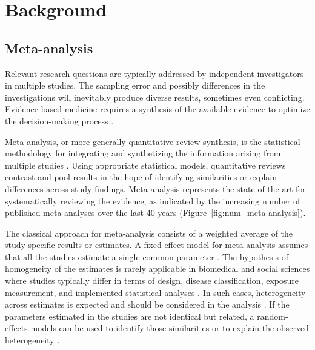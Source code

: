 \documentclass[11pt,a4paper,twoside,openany]{book}\usepackage{knitr}
\begin{document}
{%

%

\chapter{Background}

\section{Meta-analysis}

Relevant research questions are typically addressed by independent investigators in multiple studies. The sampling error and possibly differences in the investigations will inevitably produce diverse results, sometimes even conflicting. Evidence-based medicine requires a synthesis of the available evidence to optimize the decision-making process \citep{haidich2010meta}. 

Meta-analysis, or more generally quantitative review synthesis, is the statistical methodology for integrating and synthetizing the information arising from multiple studies \citep{borenstein2009references}. Using appropriate statistical models, quantitative reviews contrast and pool results in the hope of identifying similarities or explain differences across study findings. Meta-analysis represents the state of the art for systematically reviewing the evidence, as indicated by the increasing number of published meta-analyses over the last 40 years (Figure~\ref{fig:num_meta-analysis}).

The classical approach for meta-analysis consists of a weighted average of the study-specific results or estimates. A fixed-effect model for meta-analysis assumes that all the studies estimate a single common parameter \citep{rice2017re}. The hypothesis of homogeneity of the estimates is rarely applicable in biomedical and social sciences where studies typically differ in terms of design, disease classification, exposure measurement, and implemented statistical analyses \citep{colditz1995heterogeneity}. In such cases, heterogeneity across estimates is expected and should be considered in the analysis \citep{higgins2008commentary}. If the parameters estimated in the studies are not identical but related, a random-effects models can be used to identify those similarities or to explain the observed heterogeneity \citep{higgins2009re}.


}
\end{document}
